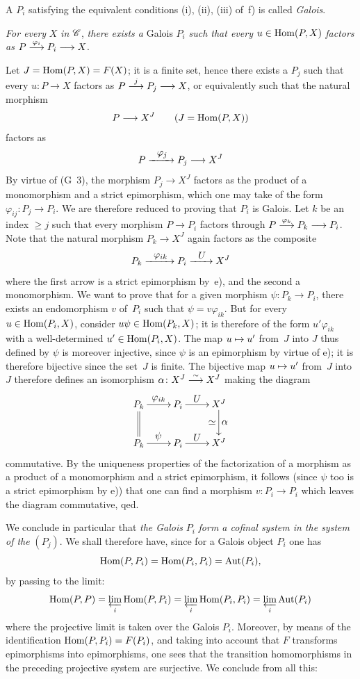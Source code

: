 \begin{enumerateb}
A $P_i$ satisfying the equivalent conditions
(i), (ii), (iii)
of~f) is called \emph{Galois}.

\item[g)] \emph{For every} $X$ \emph{in} $\cal{C}$, \emph{there exists
a} Galois $P_i$ \emph{such that every} $u \in \operatorname{Hom}(P,X)$ \emph{factors
as} $P \lto{\varphi_i} P_i \longrightarrow X$.

Let $J=\operatorname{Hom}(P,X)=F(X)$; it is a finite set, hence there exists a
$P_j$ such that every $u \colon P \to X$ factors as $P\lto{j}P_j\longrightarrow X$, or equivalently such that the natural morphism
$$
P \to X^J \qquad (J=\Hom(P,X))
$$
factors as
$$
P \lto{\varphi_j} P_j \to X^J
$$
By
virtue of (G~3), the morphism $P_j \to X^J$ factors as the product
of a monomorphism and a strict epimorphism, which one may
take of the form $\varphi_{ij} \colon P_j \to P_i$. We are therefore
reduced to proving that $P_i$ is Galois. Let $k$ be an index
$\geq j$ such that every morphism $P \to P_i$ factors through
$P \lto{\varphi_k} P_k \longrightarrow P_i$. Note that the
natural morphism $P_k \to X^J$ again factors as the composite
$$
P_k \lto{\varphi_{ik}} P_i \lto{U} X^J
$$
where the first arrow is a strict epimorphism
by~e), and the second a monomorphism. We want to prove that for
a given morphism $\psi \colon P_k \to P_i$, there exists an
endomorphism $v$ of~$P_i$ such that $\psi = v \varphi_{ik}$. But for
every $u \in \operatorname{Hom}(P_i,X)$, consider $u \psi \in \operatorname{Hom}(P_k,X)$;
it is therefore of the form $u'\varphi_{ik}$ with a well-determined
$u' \in \operatorname{Hom}(P_i,X)$. The map $u \mto u'$ from~$J$ into $J$
thus defined by $\psi$ is moreover injective, since $\psi$ is
an epimorphism by virtue of e); it is therefore bijective since
the set~$J$ is finite. The bijective map $u \mto u'$ from~$J$
into $J$ therefore defines an isomorphism $\alpha \colon X^J \overset{\sim}{\longrightarrow}
X^J$ making the diagram
$$
\xymatrix{P_k \ar[r]^-{\varphi_{ik}} \ar@{=}[d] & P_i \ar[r]^-U & X^J
\ar[d]^-{\alpha}_-{\simeq} \\ P_k \ar[r]^{\psi} & P_i \ar[r]^-U & X^J}
$$
commutative. By the uniqueness properties of the factorization
of a morphism as a product of a monomorphism and a strict
epimorphism, it follows (since $\psi$ too is a strict
epimorphism by e)) that one can find a morphism $v \colon P_i \to
P_i$ which leaves the diagram commutative, qed.

We conclude in particular that \emph{the Galois} $P_i$
\emph{form a cofinal system in the system of the} $(P_j)$. We
shall therefore have, since for a Galois object $P_i$ one has
$$
\operatorname{Hom}(P,P_i)=\operatorname{Hom}(P_i,P_i)=\operatorname{Aut}(P_i),
$$
by passing to the limit:
$$
\operatorname{Hom}(P,P) = \varprojlim_{i} \operatorname{Hom}(P,P_i) = \varprojlim_{i} \operatorname{Hom}(P_i,P_i) =
\varprojlim_{i} \operatorname{Aut}(P_i)
$$
where
the projective limit is taken over the Galois $P_i$. Moreover,
by means of the identification $\operatorname{Hom}(P,P_i)=F(P_i)$, and taking into account that
$F$ transforms epimorphisms into epimorphisms, one sees that the
transition homomorphisms in the preceding projective system
are surjective. We conclude from all this:


\end{enumerateb}
